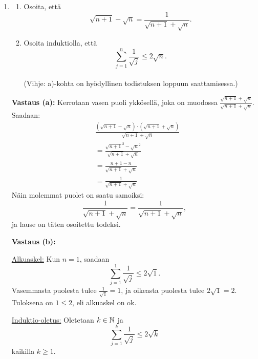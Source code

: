 \documentclass[a4paper,12pt]{article}
\begin{document}
\begin{enumerate}
Nyt induktio-oletuksen avulla saatu yhtälön oikea puoli vastaa induktioväitettä.

\underline{Johtopäätös:} Alkuaskeleesta ja induktioaskeleesta seuraa induktioperiaatteen nojalla, että $L_n=\frac{1}{3}\cdot (-1)^n+\frac{2}{3}\cdot 2^n$ kaikilla $n \in \N$. 

\item 
\begin{enumerate}
    \item Osoita, että \\
$$\sqrt{n+1}-\sqrt{n}=\frac{1}{\sqrt{n+1}+\sqrt{n}}.$$

    \item Osoita induktiolla, että
    $$\sum_{j=1}^n \frac{1}{\sqrt{j}} \leq 2\sqrt{n}.$$ \\ 
    
    (Vihje: a)-kohta on hyödyllinen todistuksen loppuun saattamisessa.)
\end{enumerate}

\textbf{Vastaus (a):} Kerrotaan vasen puoli ykkösellä, joka on muodossa $\frac{\sqrt{n+1}+\sqrt{n}}{\sqrt{n+1}+\sqrt{n}}$. Saadaan:
\begin{align*}
    &\frac{(\sqrt{n+1}-\sqrt{n})\cdot (\sqrt{n+1}+\sqrt{n})}{\sqrt{n+1}+\sqrt{n}}\\
    &=\frac{\sqrt{n+1}^2-\sqrt{n}^2}{\sqrt{n+1}+\sqrt{n}}\\
    &=\frac{n+1-n}{\sqrt{n+1}+\sqrt{n}}\\
    &=\frac{1}{\sqrt{n+1}+\sqrt{n}}
\end{align*}
Näin molemmat puolet on saatu samoiksi:
\begin{equation*}
    \frac{1}{\sqrt{n+1}+\sqrt{n}}=\frac{1}{\sqrt{n+1}+\sqrt{n}},
\end{equation*}
ja lause on täten osoitettu todeksi. 

\textbf{Vastaus (b):} 

\underline{Alkuaskel:} Kun $n=1$, saadaan $$\sum_{j=1}^1 \frac{1}{\sqrt{j}} \leq 2\sqrt{1}.$$ Vasemmasta puolesta tulee $\frac{1}{\sqrt{1}}=1$, ja oikeasta puolesta tulee $2\sqrt{1}=2$. Tuloksena on $1\leq2$, eli alkuaskel on ok.

\underline{Induktio-oletus:}  Oletetaan $k\in \mathbb{N}$ ja $$\sum_{j=1}^k \frac{1}{\sqrt{j}} \leq 2\sqrt{k}$$
kaikilla $k\geq 1$.


\end{enumerate}
\end{document}
